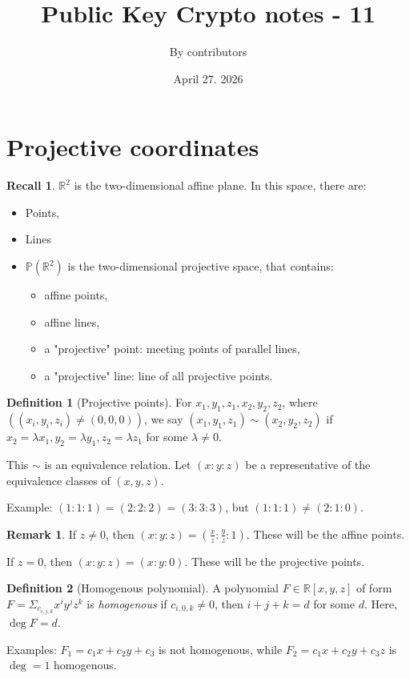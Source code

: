 \documentclass[11pt]{article}
\theoremstyle{definition}
\newtheorem{definition}{Definition}[section]
\newtheorem{remark}{Remark}[section]
\newtheorem{recall}{Recall}[section]
\theoremstyle{proof}
\begin{document}
\title{Public Key Crypto notes - 11}
\author{By contributors}
\date{April 27. 2026}
\maketitle

\section{Projective coordinates}

\begin{recall}
	$\mathbb{R}^2$ is the two-dimensional affine plane. In this space, there are:
	\begin{itemize}
		\item Points,
		\item Lines
		\item $\mathbb{P}(\mathbb{R}^2)$ is the two-dimensional projective space, that contains:
		\begin{itemize}
			\item affine points,
			\item affine lines,
			\item a "projective" point: meeting points of parallel lines,
			\item a "projective" line: line of all projective points.
		\end{itemize}
	\end{itemize}
\end{recall}

\begin{definition}[Projective points]
	For $x_1, y_1, z_1, x_2, y_2, z_2$, where $((x_i, y_i, z_i) \ne (0, 0, 0))$, we say $(x_1, y_1, z_1) \sim (x_2, y_2, z_2)$ if $x_2 = \lambda x_1, y_2 = \lambda y_1, z_2 = \lambda z_1$ for some $\lambda \ne 0$.
	
	This $\sim$ is an equivalence relation. Let $(x:y:z)$ be a representative of the equivalence classes of $(x, y, z)$.
	
	Example: $(1:1:1) = (2:2:2) = (3:3:3)$, but $(1:1:1) \ne (2:1:0)$.
\end{definition}

\begin{remark}
	If $z \ne 0$, then $(x:y:z) = (\frac{x}{z}:\frac{y}{z}:1)$. These will be the affine points.
	
	If $z = 0$, then $(x:y:z) = (x:y:0)$. These will be the projective points.
\end{remark}

\begin{definition}[Homogenous polynomial]
	A polynomial $F \in \mathbb{R}[x, y, z]$ of form $F = \Sigma_{c_{i,j,k}}x^i y^j z^k$ is \emph{homogenous} if $c_{i, 0, k} \ne 0$, then $i + j + k = d$ for some $d$. Here, $\deg F = d$.
	
	Examples: $F_1 = c_1 x + c_2 y + c_3$ is not homogenous, while $F_2 = c_1 x + c_2 y + c_3 z$ is $\deg = 1$ homogenous.
\end{definition}
\end{document}
